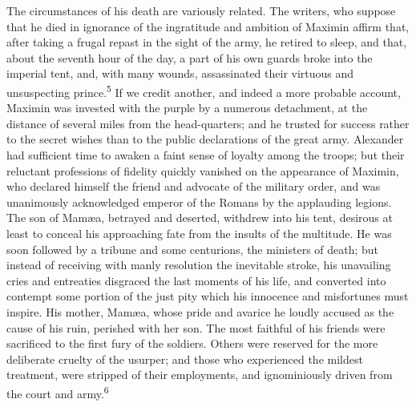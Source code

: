 The circumstances of his death are variously related. The
writers, who suppose that he died in ignorance of the ingratitude
and ambition of Maximin affirm that, after taking a frugal repast
in the sight of the army, he retired to sleep, and that, about
the seventh hour of the day, a part of his own guards broke into
the imperial tent, and, with many wounds, assassinated their
virtuous and unsuspecting prince.\textsuperscript{5} If we credit another, and
indeed a more probable account, Maximin was invested with the
purple by a numerous detachment, at the distance of several miles
from the head-quarters; and he trusted for success rather to the
secret wishes than to the public declarations of the great army.
Alexander had sufficient time to awaken a faint sense of loyalty
among the troops; but their reluctant professions of fidelity
quickly vanished on the appearance of Maximin, who declared
himself the friend and advocate of the military order, and was
unanimously acknowledged emperor of the Romans by the applauding
legions. The son of Mamæa, betrayed and deserted, withdrew into
his tent, desirous at least to conceal his approaching fate from
the insults of the multitude. He was soon followed by a tribune
and some centurions, the ministers of death; but instead of
receiving with manly resolution the inevitable stroke, his
unavailing cries and entreaties disgraced the last moments of his
life, and converted into contempt some portion of the just pity
which his innocence and misfortunes must inspire. His mother,
Mamæa, whose pride and avarice he loudly accused as the cause of
his ruin, perished with her son. The most faithful of his friends
were sacrificed to the first fury of the soldiers. Others were
reserved for the more deliberate cruelty of the usurper; and
those who experienced the mildest treatment, were stripped of
their employments, and ignominiously driven from the court and
army.\textsuperscript{6}



